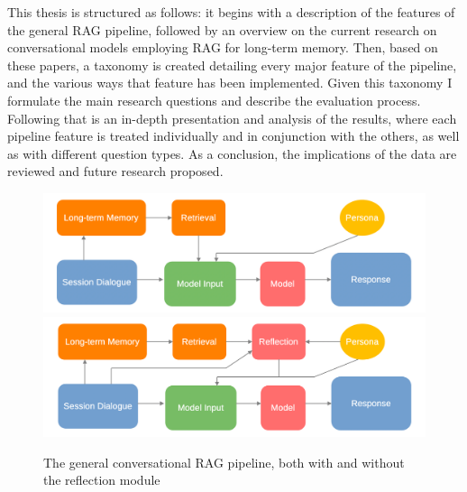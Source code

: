 	This thesis is structured as follows: it begins with a description of the features of the general RAG pipeline, followed by an overview on the current research on conversational models employing RAG for long-term memory. Then, based on these papers, a taxonomy is created detailing every major feature of the pipeline, and the various ways that feature has been implemented. Given this taxonomy I formulate the main research questions and describe the evaluation process. Following that is an in-depth presentation and analysis of the results, where each pipeline feature is treated individually and in conjunction with the others, as well as with different question types. As a conclusion, the implications of the data are reviewed and future research proposed.
	
	
\noindent
\begin{figure}[H]
\label{pipeline}
\includegraphics[width=1\textwidth]{images/pipeline}
\includegraphics[width=1\textwidth]{images/pipeline_2}
\caption{The general conversational RAG pipeline, both with and without the reflection module}
\end{figure}
